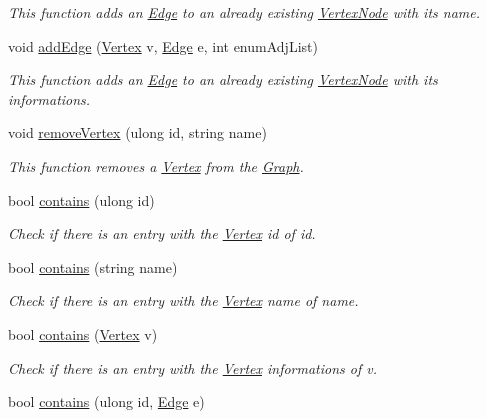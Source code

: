 \begin{DoxyCompactItemize}
\begin{DoxyCompactList}\small\item\em This function adds an \hyperlink{classEdge}{Edge} to an already existing \hyperlink{classVertexNode}{Vertex\+Node} with its name. \end{DoxyCompactList}\item 
void \hyperlink{classGraph_a32cd4eabd71e39e2d9a3b7a1d4ede72a}{add\+Edge} (\hyperlink{structVertex}{Vertex} v, \hyperlink{classEdge}{Edge} e, int enum\+Adj\+List)
\begin{DoxyCompactList}\small\item\em This function adds an \hyperlink{classEdge}{Edge} to an already existing \hyperlink{classVertexNode}{Vertex\+Node} with its informations. \end{DoxyCompactList}\item 
void \hyperlink{classGraph_a79c17a671d86709b585bcdd614533123}{remove\+Vertex} (ulong id, string name)
\begin{DoxyCompactList}\small\item\em This function removes a \hyperlink{structVertex}{Vertex} from the \hyperlink{classGraph}{Graph}. \end{DoxyCompactList}\item 
bool \hyperlink{classGraph_a4442c1741b2a675c675e5cf7eb1212f6}{contains} (ulong id)
\begin{DoxyCompactList}\small\item\em Check if there is an entry with the \hyperlink{structVertex}{Vertex} id of id. \end{DoxyCompactList}\item 
bool \hyperlink{classGraph_a9d60fda50153d8e9a9c93a7169423b77}{contains} (string name)
\begin{DoxyCompactList}\small\item\em Check if there is an entry with the \hyperlink{structVertex}{Vertex} name of name. \end{DoxyCompactList}\item 
bool \hyperlink{classGraph_a0bc0b974a6c5cc201725227cdd81ede5}{contains} (\hyperlink{structVertex}{Vertex} v)
\begin{DoxyCompactList}\small\item\em Check if there is an entry with the \hyperlink{structVertex}{Vertex} informations of v. \end{DoxyCompactList}\item 
bool \hyperlink{classGraph_a94644d90ce28798e081bfc54af466efc}{contains} (ulong id, \hyperlink{classEdge}{Edge} e)

\end{DoxyCompactItemize}
